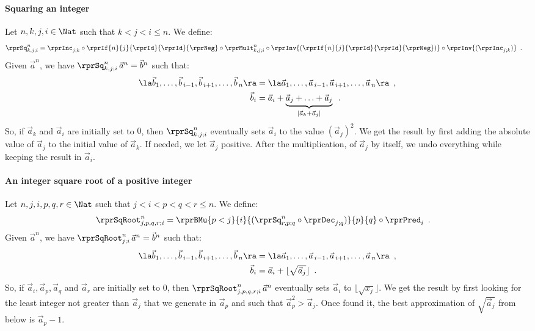 \paragraph{Squaring an integer}
Let $n, k, j, i\in\Nat$ such that $ k < j < i \leq n$.
We define:
\begin{align*}
\rprSq^n_{k,j;i} & = 
\rprInc_{j;k} \circ 
\rprIf{n}{j}{\rprId}{\rprId}{\rprNeg} \circ 
\rprMult^{n}_{k,j;i} \circ 
\rprInv{(\rprIf{n}{j}{\rprId}{\rprId}{\rprNeg})}\circ
\rprInv{(\rprInc_{j;k})}
\enspace .
\end{align*}
Given $ \vec{a}^{n} $, we have 
$ \rprSq^n_{k,j;i}\, \vec{a}^n = \vec{b}^n$ such that:
\begin{align*}
\la \vec{b}_1,\ldots,\vec{b}_{\,i-1},\vec{b}_{\,i+1},\ldots,\vec{b}_{\,n}\ra
 & = \la \vec{a}_1,\ldots,\vec{a}_{\,i-1},\vec{a}_{\,i+1},\ldots,\vec{a}_{\,n}\ra
\enspace ,
\\
\vec{b}_i & = \vec{a}_i + \underbrace{\vec{a}_j + \ldots + \vec{a}_j}_{\mid \vec{a}_k +\vec{a}_j \mid}
\enspace .
\end{align*}
So, if $ \vec{a}_k $ and $ \vec{a}_i $ are initially set to $ 0 $, then 
$ \rprSq^n_{k,j;i} $ eventually sets $ \vec{a}_i $ to the value $ (\vec{a}_j)^2 $.
We get the result by first adding the absolute value of $ \vec{a}_j $ to the initial value of 
$ \vec{a}_k $. If needed, we let $ \vec{a}_j $ positive. After the multiplication, of
$ \vec{a}_j $ by itself, we undo everything while keeping the result in $ \vec{a}_i $.


\paragraph{An integer square root of a positive integer}
Let $n, j, i, p, q, r\in\Nat$ such that $ j < i < p < q < r \leq n$. We define:
\begin{align*}
\rprSqRoot^n_{j,p,q,r;i} & =
\rprBMu{p<j}{i}
       { (\rprSq^n_{r,p;q}\circ
          \rprDec_{j;q}
         )
       }
       {p}{q}
\circ 
\rprPred_i
\enspace .
\end{align*}
Given $ \vec{a}^{n}$, we have 
$ \rprSqRoot^n_{j;i}\, \vec{a}^n = \vec{b}^n$ such that:
\begin{align*}
\la \vec{b}_1,\ldots,\vec{b}_{\,i-1},\vec{b}_{\,i+1},\ldots,\vec{b}_{\,n}\ra
 & = \la \vec{a}_1,\ldots,\vec{a}_{\,i-1},\vec{a}_{\,i+1},\ldots,\vec{a}_{\,n}\ra
\enspace ,
\\
\vec{b}_i & = 
\vec{a}_i + \lfloor \sqrt{\vec{a}_j}\rfloor 
\enspace .
\end{align*}
So, if $ \vec{a}_i, \vec{a}_p, \vec{a}_q$ and $ \vec{a}_r$ are initially set to $ 0 $, then 
$ \rprSqRoot^n_{j,p,q,r;i}\, \vec{a}^n $ eventually sets $ \vec{a}_i $ to  $ \lfloor \sqrt{x_j}\rfloor $.
We get the result by first looking for the least integer not greater than $ \vec{a}_j $ that we generate in 
$ \vec{a}_p $ and such that $ \vec{a}_p^2 > \vec{a}_j  $. Once found it, the best approximation of $ \sqrt{\vec{a}_j} $ 
from below is $ \vec{a}_p - 1$.



